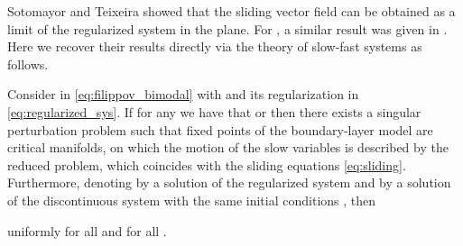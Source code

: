 \documentclass[twocolumn]{autart}
\begin{document}
Sotomayor and Teixeira showed that the sliding vector field  can be obtained as a limit of the regularized system in the plane. For , a similar result was given in \citep[Theorem 1.1]{llibre_sliding_2008}. Here we recover their results directly via the theory of slow-fast systems \citep{kuehn2015book} as follows.
\begin{lem}
\label{thm:regularization}
Consider  in \eqref{eq:filippov_bimodal} with  and its regularization  in \eqref{eq:regularized_sys}. If for any  we have that  or  then there exists a singular perturbation problem such that fixed points of the boundary-layer model are critical manifolds, on which the motion of the slow variables is described by the reduced problem, which coincides with the sliding equations \eqref{eq:sliding}.\\
Furthermore, denoting by  a solution of the regularized system and by  a solution of the discontinuous system with the same initial conditions , then

uniformly for all  and for all .
\end{lem}
\end{document}
